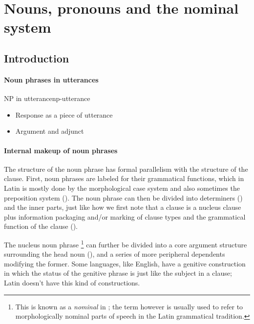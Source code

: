 \documentclass[a4paper, oneside, 12pt]{report}
\newcommand*{\term}[1]{\emph{#1}}
\begin{document}
\section{Nouns, pronouns and the nominal system}\label{sec:grammatical.np}

\subsection{Introduction}

\paragraph*{Noun phrases in utterances}

\begin{todobox}{NP in utterance}{np-utterance}
    \begin{itemize}
        \item Response as a piece of utterance
        \item Argument and adjunct
    \end{itemize}
\end{todobox}

\paragraph*{Internal makeup of noun phrases}
The structure of the noun phrase has formal parallelism with the structure of the clause.
First, noun phrases are labeled for their grammatical functions,
which in Latin is mostly done by the morphological case system
and also sometimes the preposition system 
().
The noun phrase can then be divided into determiners
() and the inner parts,
just like how we first note that a clause is a nucleus clause plus 
information packaging and/or marking of clause types and the grammatical function of the clause 
().

The nucleus noun phrase%
\footnote{
    This is known as a \term{nominal} in \citet{cgel};
    the term however is usually used to refer to morphologically nominal parts of speech in 
    the Latin grammatical tradition.
}
can further be divided into a core argument structure surrounding the head noun
(),
and a series of more peripheral dependents modifying the former.
Some languages, like English, have a genitive construction 
in which the status of the genitive phrase is just like the subject in a clause;
Latin doesn't have this kind of constructions.
\end{document}
